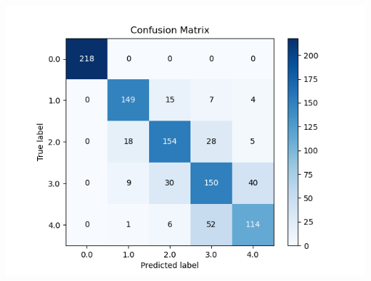 \documentclass[10pt,a4paper]{article}
\begin{document}
\begin{center}
\includegraphics[scale=0.7]{img/pred_mod_loc.png}
\end{center}

\newpage
\end{document}
